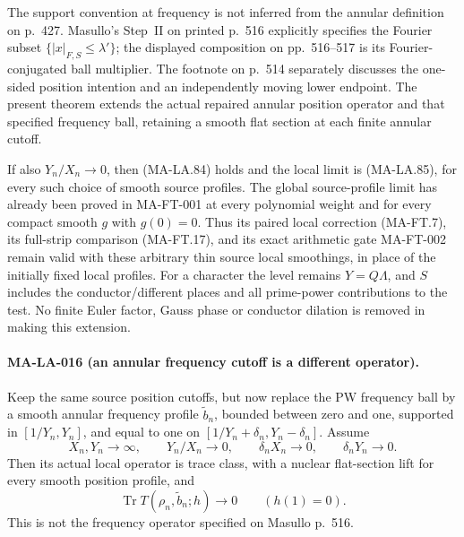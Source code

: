 The support convention at frequency is not inferred
from the annular definition on p.~427.
Masullo's Step~II on printed p.~516 explicitly specifies
the Fourier subset \(\{|x|_{F,S}\le\lambda'\}\);
the displayed composition on pp.~516--517 is its
Fourier-conjugated ball multiplier.
The footnote on p.~514 separately discusses the
one-sided position intention and an independently
moving lower endpoint.  The present theorem extends
the actual repaired annular position operator and
that specified frequency ball, retaining a smooth
flat section at each finite annular cutoff.

If also \(Y_n/X_n\to0\), then (MA-LA.84) holds and
the local limit is (MA-LA.85), for every such choice
of smooth source profiles.  The global source-profile
limit has already been proved in MA-FT-001 at every
polynomial weight and for every compact smooth
\(g\) with \(g(0)=0\).
Thus its paired local correction (MA-FT.7), its
full-strip comparison (MA-FT.17), and its exact
arithmetic gate MA-FT-002 remain valid with these
arbitrary thin source local smoothings, in place
of the initially fixed local profiles.
For a character the level remains \(Y=Q\Lambda\),
and \(S\) includes the conductor/different places
and all prime-power contributions to the test.
No finite Euler factor, Gauss phase or conductor
dilation is removed in making this extension.

\paragraph{MA-LA-016 (an annular frequency cutoff is a different operator).}
Keep the same source position cutoffs, but now replace
the PW frequency ball by a smooth annular frequency
profile \(\widetilde b_n\), bounded between zero and one,
supported in \([1/Y_n,Y_n]\), and equal to one on
\([1/Y_n+\delta_n,Y_n-\delta_n]\).
Assume
\[
 X_n,Y_n\to\infty,\qquad Y_n/X_n\to0,\qquad
 \delta_nX_n\to0,\qquad\delta_nY_n\to0 .
 \tag{MA-LA.92}
\]
Then its actual local operator is trace class, with
a nuclear flat-section lift for every smooth
position profile, and
\[
             \operatorname{Tr}T(\rho_n,\widetilde b_n;h)
                         \longrightarrow0
                         \qquad(h(1)=0).
 \tag{MA-LA.93}
\]
This is not the frequency operator specified on
Masullo p.~516.


